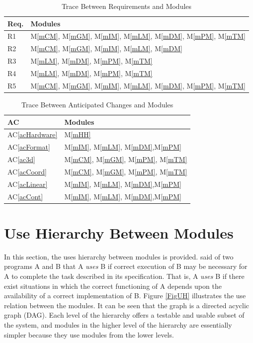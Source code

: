 \documentclass[12pt, titlepage]{article}
\newcommand{\acref}[1]{AC\ref{#1}}
\newcommand{\mref}[1]{M\ref{#1}}
\begin{document}
\begin{table}[H]
\centering
\begin{tabular}{p{} p{}}
\toprule
\textbf{Req.} & \textbf{Modules}\\
\midrule
R1 & \mref{mCM}, \mref{mGM}, \mref{mIM}, \mref{mLM}, \mref{mDM}, 
\mref{mPM}, \mref{mTM}\\
R2 & \mref{mCM}, \mref{mGM}, \mref{mIM}, \mref{mLM}, \mref{mDM}\\
R3 & \mref{mLM}, \mref{mDM}, \mref{mPM}, \mref{mTM}\\
R4 & \mref{mLM}, \mref{mDM}, \mref{mPM}, \mref{mTM}\\
R5 & \mref{mCM}, \mref{mGM}, \mref{mIM}, \mref{mLM}, \mref{mDM}, 
\mref{mPM}, \mref{mTM}\\
\bottomrule
\end{tabular}
\caption{Trace Between Requirements and Modules}
\label{TblRT}
\end{table}

\begin{table}[H]
\centering
\begin{tabular}{p{} p{}}
\toprule
\textbf{AC} & \textbf{Modules}\\
\midrule
\acref{acHardware} & \mref{mHH}\\
\acref{acFormat} & \mref{mIM}, \mref{mLM}, \mref{mDM},\mref{mPM}\\
\acref{ac3d} & \mref{mCM}, \mref{mGM}, \mref{mPM}, \mref{mTM}\\
\acref{acCoord} & \mref{mCM}, \mref{mGM}, \mref{mPM}, \mref{mTM}\\
\acref{acLinear} & \mref{mIM}, \mref{mLM}, \mref{mDM},\mref{mPM}\\
\acref{acCont} & \mref{mIM}, \mref{mLM}, \mref{mDM},\mref{mPM}\\
\bottomrule
\end{tabular}
\caption{Trace Between Anticipated Changes and Modules}
\label{TblACT}
\end{table}

\section{Use Hierarchy Between Modules} \label{SecUse}

In this section, the uses hierarchy between modules is provided. 
\citet{Parnas1978} said of two programs A and B that A {\em uses} B if
correct execution of B may be necessary for A to complete the task described in
its specification. That is, A {\em uses} B if there exist situations in which
the correct functioning of A depends upon the availability of a correct
implementation of B.  Figure \ref{FigUH} illustrates the use relation between
the modules. It can be seen that the graph is a directed acyclic graph
(DAG). Each level of the hierarchy offers a testable and usable subset of the
system, and modules in the higher level of the hierarchy are essentially 
simpler because they use modules from the lower levels.
\end{document}
